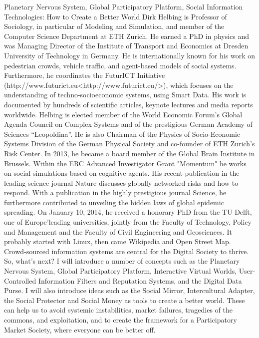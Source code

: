 %
{Planetary Nervous System, Global Participatory Platform, Social Information Technologies: How to Create a Better World}%
{Dirk Helbing is Professor of Sociology, in particular of Modeling and Simulation, and member of the Computer Science Department at ETH Zurich. He earned a PhD in physics and was Managing Director of the Institute of Transport and Economics at Dresden University of Technology in Germany. He is internationally known for his work on pedestrian crowds, vehicle traffic, and agent-based models of social systems. Furthermore, he coordinates the FuturICT Initiative (http://www.futurict.eu<http://www.futurict.eu/>), which focuses on the understanding of techno-socioeconomic systems, using Smart Data. His work is documented by hundreds of scientific articles, keynote lectures and media reports worldwide. Helbing is elected member of the World Economic Forum’s Global Agenda Council on Complex Systems and of the prestigious German Academy of Sciences “Leopoldina”. He is also Chairman of the Physics of Socio-Economic Systems Division of the German Physical Society and co-founder of ETH Zurich’s Risk Center. In 2013, he became a board member of the Global Brain Institute in Brussels. Within the ERC Advanced Investigator Grant "Momentum" he works on social simulations based on cognitive agents. His recent publication in the leading science journal Nature discusses globally networked risks and how to respond. With a publication in the highly prestigious journal Science, he furthermore contributed to unveiling the hidden laws of global epidemic spreading. On January 10, 2014, he received a honorary PhD from the TU Delft, one of Europe'leading universities, jointly from the Faculty of Technology, Policy and Management and the Faculty of Civil Engineering and Geosciences. }%
{It probably started with Linux, then came Wikipedia and Open Street Map. Crowd-sourced information systems
are central for the Digital Society to thrive. So, what's next? I will introduce a number of concepts such as
the Planetary Nervous System, Global Participatory Platform, Interactive Virtual Worlds, User-Controlled
Information Filters and Reputation Systems, and the Digital Data Purse. I will also introduce ideas such as the Social Mirror, Intercultural Adapter, the Social Protector and Social Money as tools to create a better world. These can help us to avoid systemic instabilities, market failures, tragedies of the commons, and exploitation, and to create the framework for a Participatory Market Society, where everyone can be better off.}


